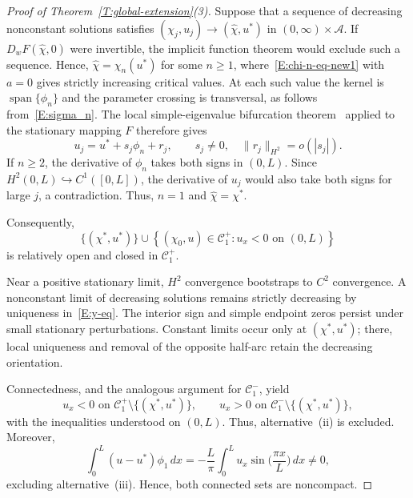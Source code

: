 \documentclass[11pt]{article} %
\theoremstyle{remark}
\theoremstyle{remark}
\numberwithin{equation}{section}
\numberwithin{figure}{section}
\numberwithin{table}{section}
\begin{document}
\begin{proof}[Proof of Theorem~\ref{T:global-extension}(3)]
  Suppose that a sequence of decreasing nonconstant solutions satisfies
  $(\chi_j,u_j) \to (\widehat{\chi}, u^*)$ in $(0, \infty)\times\mathcal{A}$. If
  $D_wF(\widehat{\chi}, 0)$ were invertible, the implicit function theorem would
  exclude such a sequence. Hence, $\widehat{\chi} = \chi_n(u^*)$ for some $n \ge
  1$, where~\eqref{E:chi-n-eq-new1} with $a = 0$ gives strictly increasing
  critical values. At each such value the kernel is
  $\operatorname{span}\{\phi_n\}$ and the parameter crossing is transversal, as
  follows from~\eqref{E:sigma_n}. The local simple-eigenvalue bifurcation
  theorem~\cite[Theorem~4.3]{shi.wang:09:on} applied to the stationary mapping
  $F$ therefore gives
  \[
    u_j=u^*+s_j\phi_n+r_j,
    \qquad s_j\ne0,\quad \|r_j\|_{H^2}=o(|s_j|).
  \]
  If $n \ge 2$, the derivative of $\phi_n$ takes both signs in $(0, L)$. Since
  $H^2(0,L)\hookrightarrow C^1([0, L])$, the derivative of $u_j$ would also take
  both signs for large $j$, a contradiction. Thus, $n = 1$ and $\widehat{\chi} =
  \chi^*$.


  Consequently,
  \[
    \{(\chi^*,u^*)\}\cup
    \left\{
    (\chi_0,u)\in\mathcal{C}_1^+:
    u_x<0\text{ on }(0,L)
    \right\}
  \]
  is relatively open and closed in $\mathcal{C}_1^+$.

  Near a positive stationary limit, $H^2$ convergence bootstraps to $C^2$
  convergence. A nonconstant limit of decreasing solutions remains strictly
  decreasing by uniqueness in~\eqref{E:y-eq}. The interior sign and simple
  endpoint zeros persist under small stationary perturbations. Constant limits
  occur only at $(\chi^*,u^*)$; there, local uniqueness and removal of the
  opposite half-arc retain the decreasing orientation.

  Connectedness, and the analogous argument for $\mathcal{C}_1^-$, yield
  \[
    u_x<0\text{ on }\mathcal{C}_1^+\setminus\{(\chi^*,u^*)\},
    \qquad
    u_x>0\text{ on }\mathcal{C}_1^-\setminus\{(\chi^*,u^*)\},
  \]
  with the inequalities understood on $(0, L)$. Thus, alternative~(ii) is
  excluded. Moreover,
  \[
    \int_0^L(u-u^*)\phi_1\,dx
    =-\frac{L}{\pi}\int_0^L
    u_x\sin\big(\frac{\pi x}{L}\big)\,dx\ne0,
  \]
  excluding alternative~(iii). Hence, both connected sets are noncompact.



\end{proof}
\end{document}
